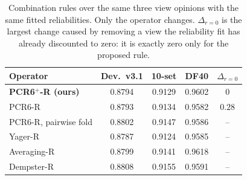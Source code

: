 \begin{table}[t]
\centering
\caption{Combination rules over the same three view opinions with the same fitted reliabilities. Only the operator changes. $\Delta_{r=0}$ is the largest change caused by removing a view the reliability fit has already discounted to zero: it is exactly zero only for the proposed rule.}
\label{tab:operators}
\small
\begin{tabular}{lcccc}
\toprule
Operator & Dev.\ v3.1 & 10-set & DF40 & $\Delta_{r=0}$ \\
\midrule
\textbf{PCR6$^+$-R (ours)} & 0.8794 & 0.9129 & 0.9602 & $0$ \\
PCR6-R & 0.8793 & 0.9134 & 0.9582 & $0.28$ \\
PCR6-R, pairwise fold & 0.8802 & 0.9147 & 0.9586 & -- \\
Yager-R & 0.8787 & 0.9124 & 0.9585 & -- \\
Averaging-R~\cite{xu2024rcml} & 0.8799 & 0.9141 & 0.9618 & -- \\
Dempster-R~\cite{shafer1976} & 0.8808 & 0.9155 & 0.9591 & -- \\
\bottomrule
\end{tabular}
\end{table}
